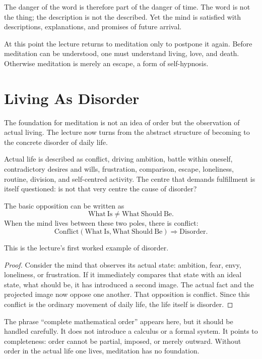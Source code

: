 The danger of the word is therefore part of the danger of time. The word is not the thing; the description is not the described. Yet the mind is satisfied with descriptions, explanations, and promises of future arrival.

At this point the lecture returns to meditation only to postpone it again. Before meditation can be understood, one must understand living, love, and death. Otherwise meditation is merely an escape, a form of self-hypnosis.

\section{Living As Disorder}

The foundation for meditation is not an idea of order but the observation of actual living. The lecture now turns from the abstract structure of becoming to the concrete disorder of daily life.

Actual life is described as conflict, driving ambition, battle within oneself, contradictory desires and wills, frustration, comparison, escape, loneliness, routine, division, and self-centred activity. The centre that demands fulfillment is itself questioned: is not that very centre the cause of disorder?

The basic opposition can be written as
\begin{equation}
\mathrm{What\ Is} \neq \mathrm{What\ Should\ Be}.
\end{equation}
When the mind lives between these two poles, there is conflict:
\begin{equation}
\mathrm{Conflict}(\mathrm{What\ Is},\mathrm{What\ Should\ Be})
\Rightarrow
\mathrm{Disorder}.
\end{equation}

This is the lecture's first worked example of disorder.

\begin{proof}
Consider the mind that observes its actual state: ambition, fear, envy, loneliness, or frustration. If it immediately compares that state with an ideal state, what should be, it has introduced a second image. The actual fact and the projected image now oppose one another. That opposition is conflict. Since this conflict is the ordinary movement of daily life, the life itself is disorder.
\end{proof}

The phrase ``complete mathematical order'' appears here, but it should be handled carefully. It does not introduce a calculus or a formal system. It points to completeness: order cannot be partial, imposed, or merely outward. Without order in the actual life one lives, meditation has no foundation.

